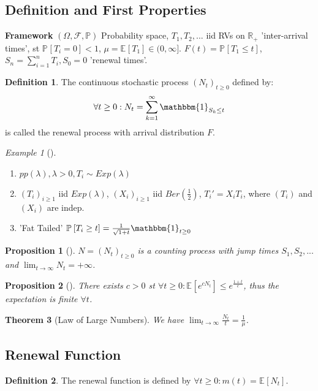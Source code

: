\documentclass[12pt]{book}
\newtheorem{theorem}{Theorem}[section]
\newtheorem{prop}[theorem]{Proposition}
\theoremstyle{definition}
\newtheorem{defn}{Definition}[section]
\theoremstyle{remark}
\newtheorem{ex}{Example}[section]
\begin{document}
\subsection{Definition and First Properties}
\textbf{Framework} $(\Omega, \mathcal{F}, \mathbb{P})$ Probability space, $T_1, T_2,...$ iid RVs on $\mathbb{R}_+$ 'inter-arrival times', st $\mathbb{P}_{} \left[ T_i = 0 \right] < 1$, $\mu = \mathbb{E}_{} \left[ T_1 \right] \in (0, \infty]$. $F(t) =  \mathbb{P}_{} \left[ T_1 \leq t \right] $, $S_n = \sum_{i=1}^{n} T_i, S_0 =0$ 'renewal times'.
\begin{defn}
	The continuous stochastic process $(N_t)_{t\geq 0}$ defined by:
\begin{align}
	\forall t \geq 0: N_t = \sum_{k=1}^{\infty} \mathbbm{1}_{S_k \leq t}
\end{align}
is called the renewal process with arrival distribution $F$.
\end{defn}

\begin{ex}[]
	\begin{enumerate}
		\item $pp(\lambda ), \lambda> 0, T_i \sim Exp(\lambda)$
		\item $(T_i)_{i\geq 1}$ iid $Exp(\lambda)$, $(X_i)_{i\geq 1}$ iid $Ber(\frac{1}{2})$, $T_i'= X_i T_i$, where  $(T_i)$ and  $(X_i)$ are indep.
		\item 'Fat Tailed' $\mathbb{P}_{} \left[ T_{i} \geq t \right] = \frac{1}{\sqrt{1+t}} \mathbbm{1}_{t\geq 0}$
	\end{enumerate}
	
\end{ex}

\begin{prop}[]
	$N = (N_t)_{t\geq 0}$ is a counting process with jump times $S_1, S_2,...$ and $\lim_{t \to \infty} N_t = + \infty$.
\end{prop}

\begin{prop}[]
	There exists $c> 0$ st $\forall t\geq 0: \mathbb{E}_{} \left[ e^{cN_t} \right] \leq e^{\frac{1+t}{c}}$, thus the expectation is finite $\forall t$.
\end{prop}

\begin{theorem}[Law of Large Numbers]
	We have $\lim_{t \to \infty} \frac{N_t}{t} = \frac{1}{\mu}$.
\end{theorem}

\subsection{Renewal Function}
\begin{defn}
	The renewal function is defined by $\forall t\geq 0: m(t) = \mathbb{E}_{} \left[ N_t \right] $.
\end{defn}
\end{document}
